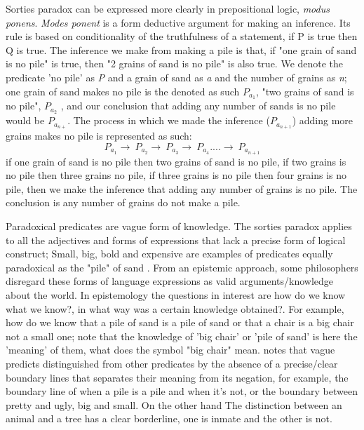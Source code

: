 Sorties paradox can be expressed more clearly in prepositional logic, \emph{modus ponens}. \emph{Modes ponent} is a form deductive argument for making an inference. Its rule is based on conditionality of the truthfulness of a statement, if P is true then Q is true. The inference we make from making a pile is that, if "one grain of sand is no pile" is true, then "2 grains of sand is no pile" is also true. We denote the predicate 'no pile' as \emph{P}  and a grain of sand as \emph{a} and the number of grains as \emph{n}; one grain of sand makes no pile is the denoted as such $ P_{a_{1}} $, "two grains of sand is no pile", $  P_{a_{2}} $ , and our conclusion that adding any number of sands is no pile would be $ P_{a_{n+}} $. The process in which we made the inference ($ P_{a_{n+1}} $) adding more grains makes no pile is represented as such: \[ P_{a_{1}} \rightarrow \ P_{a_{2}} \rightarrow \ P_{a_{3}} \rightarrow \ P_{a_{4}}.... \rightarrow \ P_{a_{n+1}} \] if one grain of sand is no pile then two grains of sand is no pile, if two grains is no pile then three grains  no pile, if three grains is no pile then four grains is no pile, then we make the inference that adding any number of grains is no pile. The conclusion is  any number of grains do not make a pile. 


Paradoxical predicates are vague form of knowledge. The sorties paradox applies to all the adjectives and forms of expressions that lack a precise form of logical construct; Small, big, bold and expensive are examples of predicates equally paradoxical as the "pile" of sand \cite{kennedy2007vagueness}. From an epistemic approach, some philosophers disregard these forms of language expressions as valid arguments/knowledge about the world. In epistemology the questions in interest are how do we know what we know?, in what way was a certain knowledge obtained?. For example, how do we know that a pile of sand is a pile of sand or that a chair is a big chair not a small one; note that the knowledge of 'big chair' or 'pile of sand' is here the 'meaning' of them, what does the symbol "big chair" mean.\cite{williamson2002vagueness} notes that vague predicts distinguished from other predicates by the absence of a precise/clear boundary lines that separates their meaning from its negation, for example, the boundary line of when a pile is a pile and when it's not, or the boundary between  pretty and ugly, big and small. On the other hand The distinction between an animal and a tree has a clear borderline, one is inmate and the other is not. 

